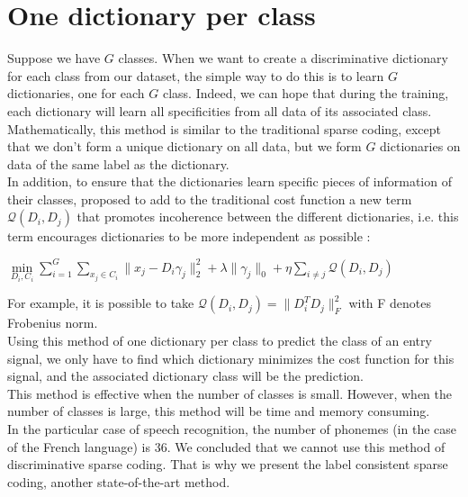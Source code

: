\section{One dictionary per class}
Suppose we have $G$ classes. When we want to create a discriminative dictionary for each class from our dataset, the simple way to do this is to learn $G$ dictionaries, one for each $G$ class. Indeed, we can hope that during the training, each dictionary will learn all specificities from all data of its associated class.\\
Mathematically, this method is similar to the traditional sparse coding, except that we don't form a unique dictionary on all data, but we form $G$ dictionaries on data of the same label as the dictionary.\\

In addition, to ensure that the dictionaries learn specific pieces of information of their classes,  \cite{5539964} proposed to add to the traditional cost function a new term $\mathcal{Q}(D_i,D_j)$ that promotes incoherence between the different dictionaries, i.e. this term encourages dictionaries to  be more independent as possible :\\
\begin{center}
 $\underset{D_i, C_i}{\min} \sum_{i=1}^{G} \sum_{x_j \in C_i} \|x_j - D_i\gamma_j\|^2_2 + \lambda \|\gamma_j\|_0+ \eta \sum_{i \neq j} \mathcal{Q}(D_i,D_j)$
\end{center}
For example, it is possible to take $\mathcal{Q}(D_i,D_j) = \|D^T_iD_j\|^2_F $ with F denotes Frobenius norm.\\
Using this method of one dictionary per class to predict the class of an entry signal, we only have to find which dictionary minimizes the cost function for this signal, and the associated dictionary class will be the prediction.\\
This method is effective when the number of classes is small. However, when the number of classes is large, this method will be time and memory consuming.\\
In the particular case of speech recognition, the number of phonemes (in the case of the French language) is 36. We concluded that we cannot use this method of discriminative sparse coding.  That is why we present the label consistent sparse coding, another state-of-the-art method.
